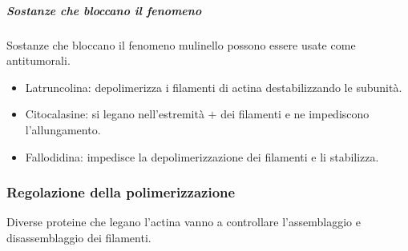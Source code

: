 				\subparagraph{Sostanze che bloccano il fenomeno}
				Sostanze che bloccano il fenomeno mulinello possono essere usate come antitumorali.
				\begin{multicols}{2}
					\begin{itemize}
						\item Latruncolina: depolimerizza i filamenti di actina destabilizzando le subunit\`a.
						\item Citocalasine: si legano nell'estremit\`a $+$ dei filamenti e ne impediscono l'allungamento.
						\item Fallodidina: impedisce la depolimerizzazione dei filamenti e li stabilizza.
					\end{itemize}
				\end{multicols}

		\subsubsection{Regolazione della polimerizzazione}
		Diverse proteine che legano l'actina vanno a controllare l'assemblaggio e disassemblaggio dei filamenti.
